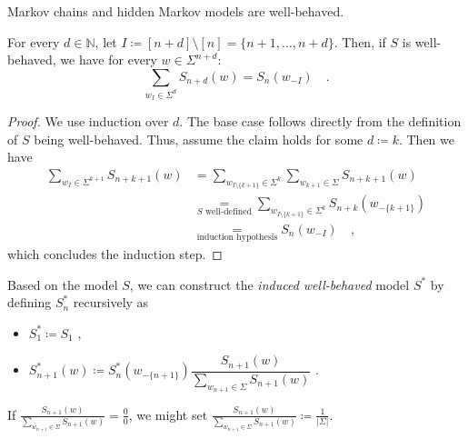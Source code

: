 \documentclass[../../main.tex]{subfiles}
\begin{document}
    \begin{remark}
        Markov chains and hidden Markov models are well-behaved.
    \end{remark}

    \begin{lemma}
        \label{lemma:random_variables_do_not_change_with_future_models}
        For every $d \in \mathbb{N}$, let $I \coloneqq [n + d] \setminus [n] = \{ n+1, \dots, n + d \}$. Then, if $S$ is well-behaved, we have for every $w \in \Sigma^{n + d}$:
        \[
            \sum_{w_I \in \Sigma^d} S_{n + d}(w) = S_n(w_{-I}) \quad .
        \]
    \end{lemma}
    \begin{proof}
        We use induction over $d$. The base case follows directly from the definition of $S$ being well-behaved. Thus, assume the claim holds for some $d \coloneqq k$. Then we have
        \begin{align*}
            \sum_{w_I \in \Sigma^{k + 1}} S_{n + k + 1}(w) &= \sum_{w_{I \setminus \{ k + 1 \}} \in \Sigma^{k}} \sum_{w_{k + 1} \in \Sigma} S_{n + k + 1}(w) \\
            &\underset{S \text{ well-defined}}{=} \sum_{w_{I \setminus \{ k + 1 \}} \in \Sigma^{k}} S_{n + k}(w_{-\{ k + 1 \}}) \\
            &\underset{\text{induction hypothesis}}{=} S_n(w_{-I}) \quad ,
        \end{align*}
        which concludes the induction step.
    \end{proof}

    \begin{definition}
        Based on the model $S$, we can construct the \emph{induced well-behaved} model $S^*$ by defining $S_n^*$ recursively as 
        \begin{itemize}
            \item $S_1^* \coloneqq S_1$ ,
            \item $S_{n + 1}^*(w) \coloneqq S_n^*(w_{-\{n+1\}}) \dfrac{S_{n+1}(w)}{\sum_{w_{n+1} \in \Sigma} S_{n+1}(w)}$ .
        \end{itemize}
    \end{definition}

    \begin{remark}
        If $\frac{S_{n+1}(w)}{\sum_{w_{n+1} \in \Sigma} S_{n+1}(w)} = \frac{0}{0}$, we might set $\frac{S_{n+1}(w)}{\sum_{w_{n+1} \in \Sigma} S_{n+1}(w)} \coloneqq \frac{1}{|\Sigma|}$.
    \end{remark}
\end{document}
